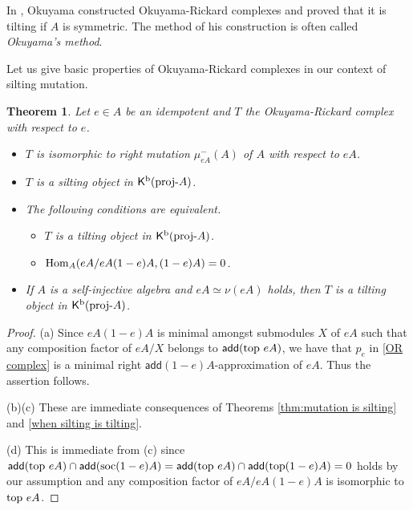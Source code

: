 \documentclass[a4paper,reqno]{amsart}
\newtheorem{theorem}{Theorem}[section]
\theoremstyle{definition}
\newcommand{\add}{\mathsf{add}}
\newcommand{\proj}[1]{{\rm{proj}}\text{-}#1} %
\newcommand{\homo}[3]{{\rm{Hom}}_{#1}(#2, #3)} %
\newcommand{\K}{\mathsf{K}}
\begin{document}
In \cite{O}, Okuyama constructed Okuyama-Rickard complexes and proved that it is tilting if $A$ is symmetric. 
The method of his construction is often called \emph{Okuyama's method}. 

Let us give basic properties of Okuyama-Rickard complexes in our context of silting mutation.

\begin{theorem}\label{prop:1_right_mu}
Let $e\in A$ be an idempotent and $T$ the Okuyama-Rickard complex with respect to $e$. 
\begin{itemize}
\item[(a)] $T$ is isomorphic to right mutation $\mu^{-}_{eA}(A)$ of $A$ with respect to $eA$.
\item[(b)] $T$ is a silting object in $\K^{\rm{b}}(\proj{A})$.
\item[(c)] The following conditions are equivalent.
\begin{itemize}
\item[(i)] $T$ is a tilting object in $\K^{\rm{b}}(\proj{A})$.
\item[(ii)] $\homo{A}{eA/eA(1-e)A}{(1-e)A}=0$.
\end{itemize}
\item[(d)] If $A$ is a self-injective algebra and $eA\simeq\nu (eA)$ holds, then $T$ is a tilting object in $\K^{\rm{b}}(\proj{A})$.
\end{itemize}
\end{theorem}

\begin{proof}
(a) Since $eA(1-e)A$ is minimal amongst submodules $X$ of $eA$ such that any composition factor of $eA/X$ belongs to $\add({\rm top}\ eA)$,
we have that $p_e$ in \eqref{OR complex} is a minimal right $\add{(1-e)A}$-approximation of $eA$. 
Thus the assertion follows.

(b)(c) These are immediate consequences of Theorems \ref{thm:mutation is silting} and \ref{when silting is tilting}.

(d) This is immediate from (c) since $\add({\rm top}\ eA)\cap\add({\rm soc}(1-e)A)=\add({\rm top}\ eA)\cap\add({\rm top} (1-e)A)=0$ holds by our assumption
and any composition factor of $eA/eA(1-e)A$ is isomorphic to ${\rm top}\ eA$.
\end{proof}
\end{document}
